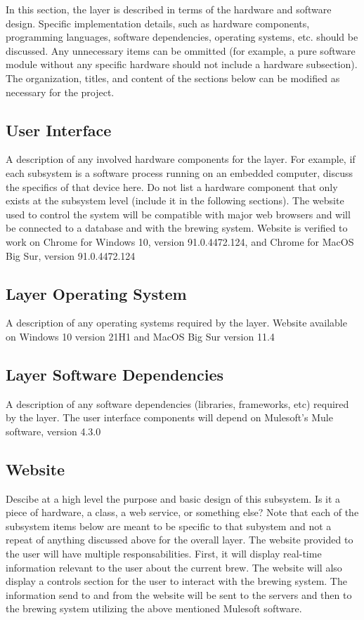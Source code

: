 In this section, the layer is described in terms of the hardware and software design. Specific implementation details, such as hardware components, programming languages, software dependencies, operating systems, etc. should be discussed. Any unnecessary items can be ommitted (for example, a pure software module without any specific hardware should not include a hardware subsection). The organization, titles, and content of the sections below can be modified as necessary for the project.

\subsection{User Interface}
A description of any involved hardware components for the layer. For example, if each subsystem is a software process running on an embedded computer, discuss the specifics of that device here. Do not list a hardware component that only exists at the subsystem level (include it in the following sections).
The website used to control the system will be compatible with major web browsers and will be connected to a database and with the brewing system. Website is verified to work on Chrome for Windows 10, version 91.0.4472.124, and Chrome for MacOS Big Sur, version 91.0.4472.124

\subsection{Layer Operating System}
A description of any operating systems required by the layer.
Website available on Windows 10 version 21H1 and MacOS Big Sur version 11.4

\subsection{Layer Software Dependencies}
A description of any software dependencies (libraries, frameworks, etc) required by the layer.
The user interface components will depend on Mulesoft's Mule software, version 4.3.0

\subsection{Website}
Descibe at a high level the purpose and basic design of this subsystem. Is it a piece of hardware, a class, a web service, or something else? Note that each of the subsystem items below are meant to be specific to that subystem and not a repeat of anything discussed above for the overall layer.
The website provided to the user will have multiple responsabilities. First, it will display real-time information relevant to the user about the current brew. The website will also display a controls section for the user to interact with the brewing system. The information send to and from the website will be sent to the servers and then to the brewing system utilizing the above mentioned Mulesoft software.

